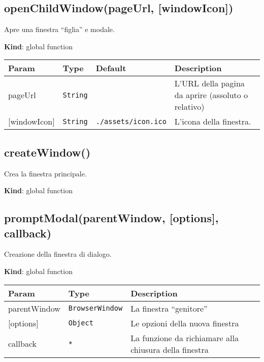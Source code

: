 \protect\hypertarget{openChildWindow}{}{}

\hypertarget{openchildwindowpageurl-windowicon}{%
\subsection{openChildWindow(pageUrl,
{[}windowIcon{]})}\label{openchildwindowpageurl-windowicon}}

Apre una finestra ``figlia'' e modale.

\textbf{Kind}: global function

\begin{tabularx}{\textwidth}{XXXX}
\toprule
Param & Type & Default & Description\tabularnewline
\midrule
\endhead
pageUrl & \texttt{String} & & L'URL della pagina da aprire (assoluto o
relativo)\tabularnewline
{[}windowIcon{]} & \texttt{String} & \texttt{./assets/icon.ico} &
L'icona della finestra.\tabularnewline
\bottomrule
\end{tabularx}

\protect\hypertarget{createWindow}{}{}

\hypertarget{createwindow}{%
\subsection{createWindow()}\label{createwindow}}

Crea la finestra principale.

\textbf{Kind}: global function\\
\protect\hypertarget{promptModal}{}{}

\hypertarget{promptmodalparentwindow-options-callback}{%
\subsection{promptModal(parentWindow, {[}options{]},
callback)}\label{promptmodalparentwindow-options-callback}}

Creazione della finestra di dialogo.

\textbf{Kind}: global function

\begin{tabularx}{\textwidth}{XXX}
\toprule
Param & Type & Description\tabularnewline
\midrule
\endhead
parentWindow & \texttt{BrowserWindow} & La finestra
``genitore''\tabularnewline
{[}options{]} & \texttt{Object} & Le opzioni della nuova
finestra\tabularnewline
callback & \texttt{*} & La funzione da richiamare alla chiusura della
finestra\tabularnewline
\bottomrule
\end{tabularx}

